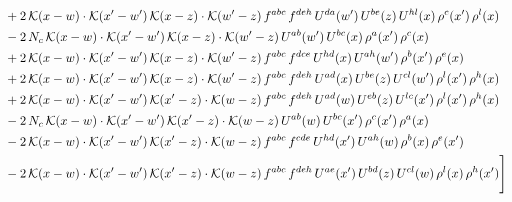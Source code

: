 \documentclass[9pt]{article}
\numberwithin{equation}{section}
\begin{document}
\begin{align}
&+2\,\mathcal{K}(x-w)\cdot\mathcal{K}(x'-w')\,\mathcal{K}(x-z)\cdot\mathcal{K}(w'-z)\,f^{abc}\,f^{deh}\,U^{da}(w')\,U^{be}(z)\,U^{hl}(x)\,\rho^{c}(x')\,\rho^{l}(x)\notag\\
&-2\,N_{c}\,\mathcal{K}(x-w)\cdot\mathcal{K}(x'-w')\,\mathcal{K}(x-z)\cdot\mathcal{K}(w'-z)\,U^{ab}(w')\,U^{bc}(x)\,\rho^{a}(x')\,\rho^{c}(x)\notag\\
&+2\,\mathcal{K}(x-w)\cdot\mathcal{K}(x'-w')\,\mathcal{K}(x-z)\cdot\mathcal{K}(w'-z)\,f^{abc}\,f^{dce}\,U^{hd}(x)\,U^{ah}(w')\,\rho^{b}(x')\,\rho^{e}(x)\notag\\
&+2\,\mathcal{K}(x-w)\cdot\mathcal{K}(x'-w')\,\mathcal{K}(x-z)\cdot\mathcal{K}(w'-z)\,f^{abc}\,f^{deh}\,U^{ad}(x)\,U^{be}(z)\,U^{cl}(w')\,\rho^{l}(x')\,\rho^{h}(x)\notag\\
&+2\,\mathcal{K}(x-w)\cdot\mathcal{K}(x'-w')\,\mathcal{K}(x'-z)\cdot\mathcal{K}(w-z)\,f^{abc}\,f^{deh}\,U^{ad}(w)\,U^{eb}(z)\,U^{lc}(x')\,\rho^{l}(x')\,\rho^{h}(x)\notag\\
&-2\,N_{c}\,\mathcal{K}(x-w)\cdot\mathcal{K}(x'-w')\,\mathcal{K}(x'-z)\cdot\mathcal{K}(w-z)\,U^{ab}(w)\,U^{bc}(x')\,\rho^{c}(x')\,\rho^{a}(x)\notag\\
&-2\,\mathcal{K}(x-w)\cdot\mathcal{K}(x'-w')\,\mathcal{K}(x'-z)\cdot\mathcal{K}(w-z)\,f^{abc}\,f^{cde}\,U^{hd}(x')\,U^{ah}(w)\,\rho^{b}(x)\,\rho^{e}(x')\notag\\
&-2\,\mathcal{K}(x-w)\cdot\mathcal{K}(x'-w')\,\mathcal{K}(x'-z)\cdot\mathcal{K}(w-z)\,f^{abc}\,f^{deh}\,U^{ae}(x')\,U^{bd}(z)\,U^{cl}(w)\,\rho^{l}(x)\,\rho^{h}(x')\Bigg]
\end{align}
\end{document}
